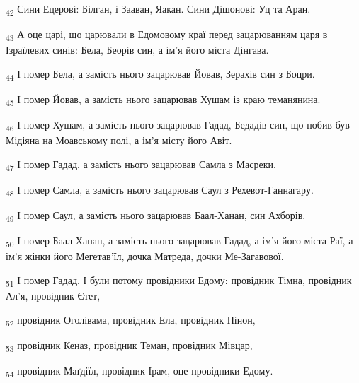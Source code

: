 \begin{tcolorbox}
\textsubscript{42} Сини Ецерові: Білган, і Зааван, Яакан. Сини Дішонові: Уц та Аран.
\end{tcolorbox}
\begin{tcolorbox}
\textsubscript{43} А оце царі, що царювали в Едомовому краї перед зацарюванням царя в Ізраїлевих синів: Бела, Беорів син, а ім'я його міста Дінгава.
\end{tcolorbox}
\begin{tcolorbox}
\textsubscript{44} І помер Бела, а замість нього зацарював Йовав, Зерахів син з Боцри.
\end{tcolorbox}
\begin{tcolorbox}
\textsubscript{45} І помер Йовав, а замість нього зацарював Хушам із краю теманянина.
\end{tcolorbox}
\begin{tcolorbox}
\textsubscript{46} І помер Хушам, а замість нього зацарював Гадад, Бедадів син, що побив був Мідіяна на Моавському полі, а ім'я місту його Авіт.
\end{tcolorbox}
\begin{tcolorbox}
\textsubscript{47} І помер Гадад, а замість нього зацарював Самла з Масреки.
\end{tcolorbox}
\begin{tcolorbox}
\textsubscript{48} І помер Самла, а замість нього зацарював Саул з Рехевот-Ганнагару.
\end{tcolorbox}
\begin{tcolorbox}
\textsubscript{49} І помер Саул, а замість нього зацарював Баал-Ханан, син Ахборів.
\end{tcolorbox}
\begin{tcolorbox}
\textsubscript{50} І помер Баал-Ханан, а замість нього зацарював Гадад, а ім'я його міста Раї, а ім'я жінки його Мегетав'їл, дочка Матреда, дочки Ме-Загавової.
\end{tcolorbox}
\begin{tcolorbox}
\textsubscript{51} І помер Гадад. І були потому провідники Едому: провідник Тімна, провідник Ал'я, провідник Єтет,
\end{tcolorbox}
\begin{tcolorbox}
\textsubscript{52} провідник Оголівама, провідник Ела, провідник Пінон,
\end{tcolorbox}
\begin{tcolorbox}
\textsubscript{53} провідник Кеназ, провідник Теман, провідник Мівцар,
\end{tcolorbox}
\begin{tcolorbox}
\textsubscript{54} провідник Маґдіїл, провідник Ірам, оце провідники Едому.
\end{tcolorbox}
